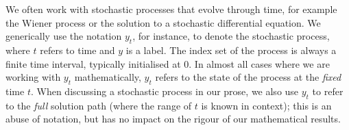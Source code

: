 We often work with stochastic processes that evolve through time, for example the Wiener process or the solution to a stochastic differential equation.
We generically use the notation \(y_t\), for instance, to denote the stochastic process, where \(t\) refers to time and \(y\) is a label.
The index set of the process is always a finite time interval, typically initialised at \(0\).
In almost all cases where we are working with \(y_t\) mathematically, \(y_t\) refers to the state of the process at the \emph{fixed} time \(t\).
When discussing a stochastic process in our prose, we also use \(y_t\) to refer to the \emph{full} solution path (where the range of \(t\) is known in context); this is an abuse of notation, but has no impact on the rigour of our mathematical results.




